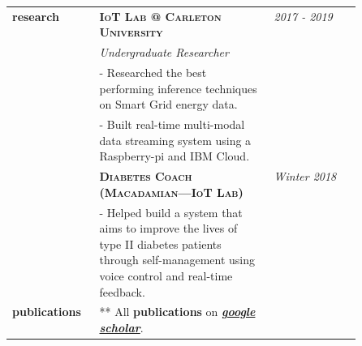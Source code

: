 \documentclass{article}
\begin{document}
\begin{longtable}{@{}>{\raggedleft}p{0.25\linewidth}
                          p{}>{}p{0.25\linewidth}@{}}
        \textbf{research}
            & \textbf{\textsc{IoT Lab @ Carleton University}} & \textit{2017 - 2019} \\
            & \textit{Undergraduate Researcher} \\
            & - Researched the best performing inference techniques on Smart Grid energy data. \\
            & - Built real-time multi-modal data streaming system using a Raspberry-pi and IBM Cloud. \\ [2em]

            & \textbf{\textsc{Diabetes Coach (Macadamian---IoT Lab)}} & \textit{Winter 2018} \\
            & - Helped build a system that aims to improve the lives of type II diabetes patients through self-management using voice control and real-time feedback. \\ [2em]

        \textbf{publications}
            & ** All \textbf{publications} on \textit{\href{https://scholar.google.ca/citations?user=zFDREhgAAAAJ\&hl=en}{\textbf{google scholar}}}.\\ [1em]

  \end{longtable}
\end{document}
